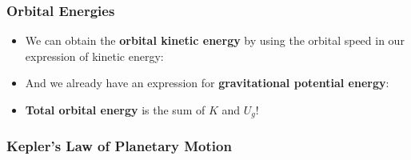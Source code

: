 \documentclass[12pt,compress,aspectratio=169]{beamer}
\begin{document}
\begin{frame}
  \frametitle{Orbital Energies}
  \begin{itemize}
  \item We can obtain the \textbf{orbital kinetic energy} by using the orbital
    speed in our expression of kinetic energy:

  \item And we already have an expression for
    \textbf{gravitational potential energy}:

  \item\textbf{Total orbital energy} is the sum of $K$ and $U_g$!

  \end{itemize}
\end{frame}


\begin{frame}
  \frametitle{Kepler's Law of Planetary Motion}
\end{frame}
\end{document}
